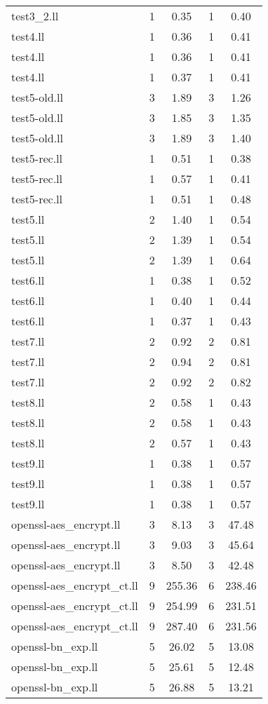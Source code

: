 \begin{tabular}{l|c|c|c|c|}
test3\_2.ll & 1 & 0.35 & 1 & 0.40\\
test4.ll & 1 & 0.36 & 1 & 0.41\\
test4.ll & 1 & 0.36 & 1 & 0.41\\
test4.ll & 1 & 0.37 & 1 & 0.41\\
test5-old.ll & 3 & 1.89 & 3 & 1.26\\
test5-old.ll & 3 & 1.85 & 3 & 1.35\\
test5-old.ll & 3 & 1.89 & 3 & 1.40\\
test5-rec.ll & 1 & 0.51 & 1 & 0.38\\
test5-rec.ll & 1 & 0.57 & 1 & 0.41\\
test5-rec.ll & 1 & 0.51 & 1 & 0.48\\
test5.ll & 2 & 1.40 & 1 & 0.54\\
test5.ll & 2 & 1.39 & 1 & 0.54\\
test5.ll & 2 & 1.39 & 1 & 0.64\\
test6.ll & 1 & 0.38 & 1 & 0.52\\
test6.ll & 1 & 0.40 & 1 & 0.44\\
test6.ll & 1 & 0.37 & 1 & 0.43\\
test7.ll & 2 & 0.92 & 2 & 0.81\\
test7.ll & 2 & 0.94 & 2 & 0.81\\
test7.ll & 2 & 0.92 & 2 & 0.82\\
test8.ll & 2 & 0.58 & 1 & 0.43\\
test8.ll & 2 & 0.58 & 1 & 0.43\\
test8.ll & 2 & 0.57 & 1 & 0.43\\
test9.ll & 1 & 0.38 & 1 & 0.57\\
test9.ll & 1 & 0.38 & 1 & 0.57\\
test9.ll & 1 & 0.38 & 1 & 0.57\\
\midrule
openssl-aes\_encrypt.ll & 3 & 8.13 & 3 & 47.48\\
openssl-aes\_encrypt.ll & 3 & 9.03 & 3 & 45.64\\
openssl-aes\_encrypt.ll & 3 & 8.50 & 3 & 42.48\\
openssl-aes\_encrypt\_ct.ll & 9 & 255.36 & 6 & 238.46\\
openssl-aes\_encrypt\_ct.ll & 9 & 254.99 & 6 & 231.51\\
openssl-aes\_encrypt\_ct.ll & 9 & 287.40 & 6 & 231.56\\
openssl-bn\_exp.ll & 5 & 26.02 & 5 & 13.08\\
openssl-bn\_exp.ll & 5 & 25.61 & 5 & 12.48\\
openssl-bn\_exp.ll & 5 & 26.88 & 5 & 13.21\\

\end{tabular}
